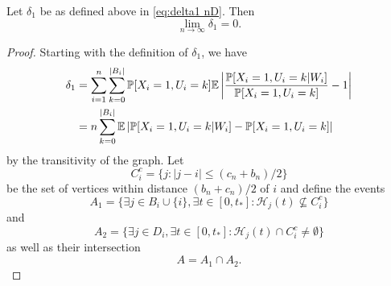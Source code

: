 	\begin{lemma}
	\label{lem:delta1 goes to 0 general}
		Let $\delta_1$ be as defined above in \eqref{eq:delta1 nD}. Then
		\begin{equation}
			\lim_{n\rightarrow\infty} \delta_1 = 0.
		\end{equation}
	\end{lemma}
	\begin{proof}
		Starting with the definition of $\delta_1$, we have
		\begin{align}
			\delta_1 &= \sum_{i = 1}^n \sum_{k = 0}^{|B_i|} \prob[X_i = 1, U_i = k] \expect \left| \frac{\prob[X_i = 1, U_i = k|W_i]}{\prob[X_i = 1, U_i = k]} - 1 \right|\\
			&= n \sum_{k = 0}^{|B_i|} \expect \left|\prob[X_i = 1, U_i = k|W_i] - \prob[X_i = 1, U_i = k] \right|%
			\label{eq:nD delta1 line 2}
		\end{align}
		by the transitivity of the graph.
		Let
		\begin{equation}
			C_i^c = \{j : |j - i| \leq (c_n + b_n)/2\}
		\end{equation}
		be the set of vertices within distance $(b_n + c_n)/2$ of $i$ and define the events
		\begin{equation}
			A_1 = \{\exists j \in B_i \cup \{i\}, \exists t \in [0, t_*] : \mathcal{H}_j(t) \nsubseteq  C_i^c\}
		\end{equation}
		and
		\begin{equation}
			A_2 = \{\exists j \in D_i, \exists t \in [0, t_*] : \mathcal{H}_j(t) \cap C_i^c \neq \emptyset\}
		\end{equation}
		as well as their intersection
		\begin{equation}
			A = A_1 \cap A_2.
		\end{equation}


\end{proof}
